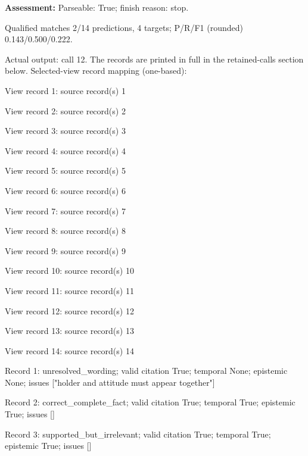\noindent\textbf{Assessment:} Parseable: True; finish reason: stop.

Qualified matches 2/14 predictions, 4 targets; P/R/F1 (rounded) 0.143/0.500/0.222.\par

Actual output: call 12. The records are printed in full in the retained-calls section below. Selected-view record mapping (one-based):

View record 1: source record(s) 1\par

View record 2: source record(s) 2\par

View record 3: source record(s) 3\par

View record 4: source record(s) 4\par

View record 5: source record(s) 5\par

View record 6: source record(s) 6\par

View record 7: source record(s) 7\par

View record 8: source record(s) 8\par

View record 9: source record(s) 9\par

View record 10: source record(s) 10\par

View record 11: source record(s) 11\par

View record 12: source record(s) 12\par

View record 13: source record(s) 13\par

View record 14: source record(s) 14\par

Record 1: unresolved\_wording; valid citation True; temporal None; epistemic None; issues ["holder and attitude must appear together"]\par

Record 2: correct\_complete\_fact; valid citation True; temporal True; epistemic True; issues []\par

Record 3: supported\_but\_irrelevant; valid citation True; temporal True; epistemic True; issues []\par

